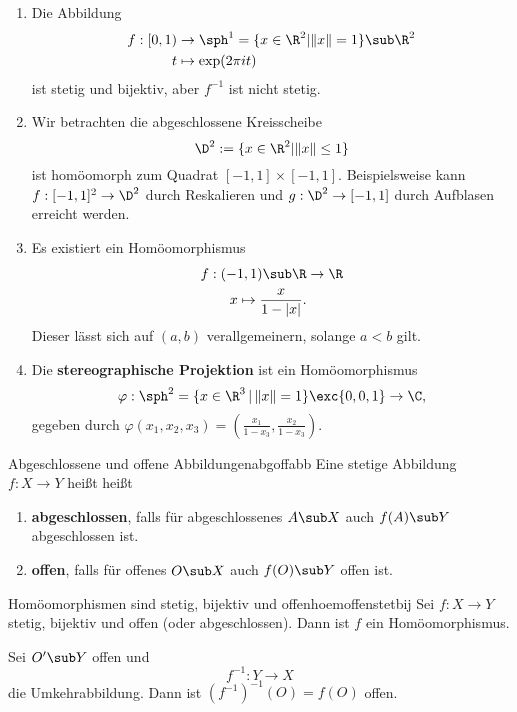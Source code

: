 \begin{beispiele}
\begin{enumerate}
\item Die Abbildung
\begin{align}
f: [0,1) &\to \sph^1 = \{x \in \R^2 | \| x\| = 1 \} \sub \R^2\\
t &\mapsto \exp(2 \pi it)
\end{align}
ist stetig und bijektiv, aber $f^{-1}$ ist nicht stetig.
\item Wir betrachten die abgeschlossene Kreisscheibe
\begin{equation}
\D^2 := \{x \in \R^2 | \|x\| \leq 1\}
\end{equation}
ist homöomorph zum Quadrat $[-1,1] \times [-1,1]$. Beispielsweise kann $f: [-1,1]^2 \to \D^2$ durch Reskalieren und $g: \D^2 \to [-1,1]$ durch Aufblasen erreicht werden.
\item Es existiert ein Homöomorphismus 
\begin{align}
f: (-1,1) \sub \R &\to \R\\
x \mapsto \frac{x}{1-|x|}.
\end{align}
Dieser lässt sich auf $(a,b)$ verallgemeinern, solange $a<b$ gilt.
\item Die \textbf{stereographische Projektion} ist ein Homöomorphismus
\begin{equation}
\varphi: \sph^2 = \{x \in \R^3 \, | \, \| x\|=1 \} \exc \{0,0,1\} \to \C,
\end{equation}
gegeben durch $\varphi(x_1,x_2,x_3) = \left( \frac{x_1}{1-x_3}, \frac{x_2}{1-x_3}\right)$.
\end{enumerate}
\end{beispiele}
\begin{definition}{Abgeschlossene und offene Abbildungen}{abgoffabb}
Eine stetige Abbildung $f: X \to Y$ heißt heißt
\begin{enumerate}
\item \textbf{abgeschlossen}, falls für abgeschlossenes $A \sub X$ auch $f(A) \sub Y$ abgeschlossen ist.
\item \textbf{offen}, falls für offenes $O \sub X$ auch $f(O) \sub Y$ offen ist.
\end{enumerate}
\end{definition}
\begin{satz}{Homöomorphismen sind stetig, bijektiv und offen}{hoemoffenstetbij}
Sei $f: X \to Y$ stetig, bijektiv und offen (oder abgeschlossen). Dann ist $f$ ein Homöomorphismus.
\end{satz}
\begin{beweis}
Sei $O' \sub Y$ offen und 
\begin{equation}
f^{-1}: Y \to X
\end{equation}
die Umkehrabbildung. Dann ist $(f^{-1})^{-1}(O) = f(O)$ offen.
\end{beweis}
